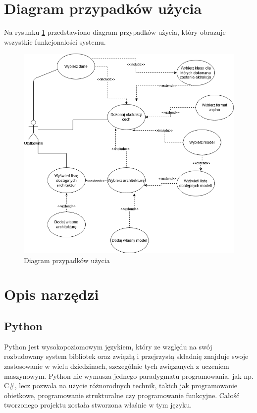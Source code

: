 \documentclass[a4paper,twoside,12pt]{book}
\begin{document}
{\section{Diagram przypadków użycia}
{Na rysunku \ref{usecase} przedstawiono diagram przypadków użycia, który obrazuje wszystkie funkcjonalości systemu.}
{
\begin{figure}[h!]

\centering
\includegraphics[scale=0.62]{usecase.png}
\caption{Diagram przypadków użycia}
\label{usecase}
\end{figure}

}
\section{Opis narzędzi}

\subsection{Python}
{Python jest wysokopoziomowym językiem, który ze względu na swój rozbudowany system bibliotek oraz zwięzłą i przejrzystą składnię znajduje swoje zastosowanie w wielu dziedzinach, szczególnie tych związanych z uczeniem maszynowym. Python nie wymusza jednego paradygmatu programowania, jak np. C\#, lecz pozwala na użycie różnorodnych technik, takich jak programowanie obietkowe, programowanie strukturalne czy programowanie funkcyjne. Całość tworzonego projektu została stworzona właśnie w tym języku.}
}
\end{document}
